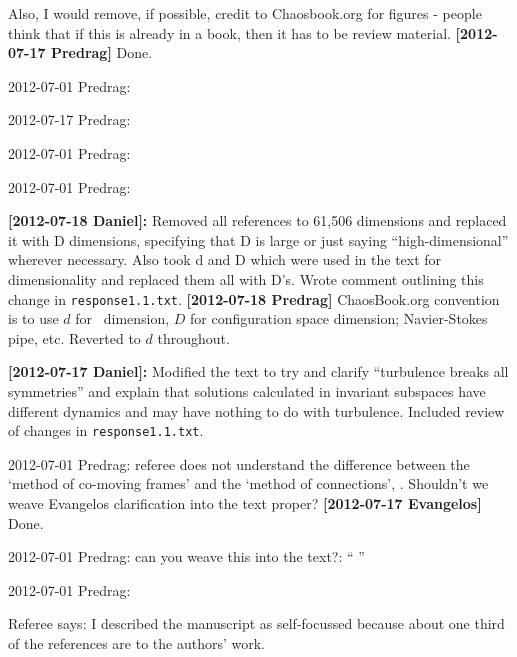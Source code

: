\begin{description}
Also, I would remove, if possible, credit to Chaosbook.org for figures -
people think that if this is already in a book, then it has to be review
material.
 {\bf [2012-07-17 Predrag]} Done.


\item[(0)  x ] 2012-07-01 Predrag:

\item[(3) |?|] 2012-07-17 Predrag:

\item[(4) |?|] 2012-07-01 Predrag:

\item[(4) |x|] 2012-07-01 Predrag:

\item[minor (1) |x|] {\bf [2012-07-18 Daniel]:} Removed all references to
61,506 dimensions and replaced it with D dimensions, specifying that D is
large or just saying ``high-dimensional'' wherever necessary. Also took
d and D which were used in the text for dimensionality and replaced them
all with D's. Wrote comment outlining this change in \texttt{response1.1.txt}.
{\bf [2012-07-18 Predrag]}
ChaosBook.org convention is to use $d$ for \statesp\ dimension, $D$ for
configuration space dimension; Navier-Stokes pipe, etc. Reverted to $d$
throughout.

\item[minor (3) |x|] {\bf [2012-07-17 Daniel]:} Modified the text to try
and clarify ``turbulence breaks all symmetries'' and explain that
solutions calculated in invariant subspaces have different dynamics and
may have nothing to do with turbulence. Included review of changes in
\texttt{response1.1.txt}.

\item[minor 6. p9 |x|] 2012-07-01 Predrag:
 referee does not understand the difference between the `method of
 co-moving frames' and the `method of connections',
 . Shouldn't we weave Evangelos clarification
 into the text proper? {\bf [2012-07-17 Evangelos]} Done.

\item[minor (9) |?|] 2012-07-01 Predrag: can you weave this into the text?: ``
''

\item[minor (11) |?|] 2012-07-01 Predrag:


\item[2012-07-19 Evangelos] Referee says: I described the manuscript as
self-focussed because about one third of the references are to the
authors' work.


\end{description}
